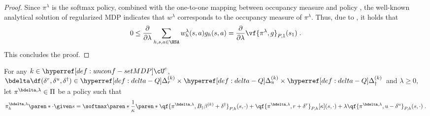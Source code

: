 \begin{proof}
Since $\pi^\lambda$ is the softmax policy, combined with the one-to-one mapping between occupancy measure and policy \citep{puterman1990markov}, the well-known analytical solution of regularized MDP \citep{geist2019theory} indicates that 
$w^\lambda$ corresponds to the occupancy measure of $\pi^\lambda$. 
Thus, due to , it holds that
$$0 \leq 
\frac{\partial}{\partial \lambda}
\sum_{h, s, a \in \HSA} w^\lambda_h(s, a)g_h(s, a)
=
\frac{\partial}{\partial \lambda}\vf{\pi^\lambda, g}_{P, 1}(s_1)\;.$$
This concludes the proof.
\end{proof}








\begin{definition}\label{def:fixed-delta-softmax}
For any $k \in \unconfMDP^c$, $\bdelta \df (\delta^r, \delta^u, \delta^\dagger) \in \Deltar \times \Deltau \times \Deltac$ and $\lambda \geq 0$, let $\pi^{\bdelta, \lambda}\in \Pi$ be a policy such that 
\begin{align*}
\pi^{\bdelta, \lambda}_h \paren*{\cdot \given s} = \softmax\paren*{\frac{1}{\kappa}\paren*{
    \qf{\pi^{\bdelta, \lambda}, B_\dagger \beta^{(k)} + \delta^\dagger}_{P, h}(s, \cdot)
    + \qf{\pi^{\bdelta, \lambda}, r + \delta^r}_{P, h}[\kappa](s, \cdot) + \lambda \qf{\pi^{\bdelta, \lambda}, u - \delta^u}_{P, h}(s, \cdot)}}\;.
\end{align*}
\end{definition}

